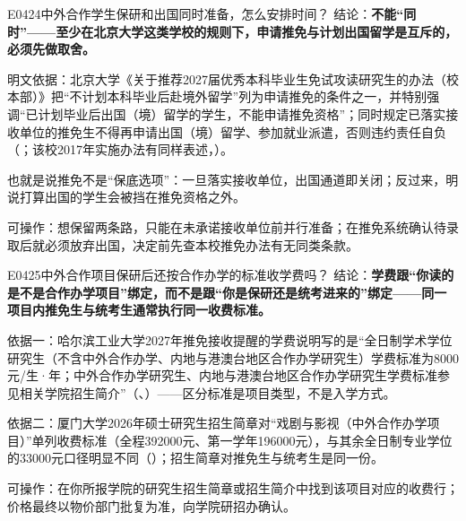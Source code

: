 \begin{qa}{E0424}{中外合作学生保研和出国同时准备，怎么安排时间？}
结论：\textbf{不能“同时”——至少在北京大学这类学校的规则下，申请推免与计划出国留学是互斥的，必须先做取舍。}

明文依据：北京大学《关于推荐2027届优秀本科毕业生免试攻读研究生的办法（校本部）》把“不计划本科毕业后赴境外留学”列为申请推免的条件之一，并特别强调“已计划毕业后出国（境）留学的学生，不能申请推免资格”；同时规定已落实接收单位的推免生不得再申请出国（境）留学、参加就业派遣，否则违约责任自负（；该校2017年实施办法有同样表述，）。

也就是说推免不是“保底选项”：一旦落实接收单位，出国通道即关闭；反过来，明说打算出国的学生会被挡在推免资格之外。

可操作：想保留两条路，只能在未承诺接收单位前并行准备；在推免系统确认待录取后就必须放弃出国，决定前先查本校推免办法有无同类条款。
\end{qa}

\begin{qa}{E0425}{中外合作项目保研后还按合作办学的标准收学费吗？}
结论：\textbf{学费跟“你读的是不是合作办学项目”绑定，而不是跟“你是保研还是统考进来的”绑定——同一项目内推免生与统考生通常执行同一收费标准。}

依据一：哈尔滨工业大学2027年推免接收提醒的学费说明写的是“全日制学术学位研究生（不含中外合作办学、内地与港澳台地区合作办学研究生）学费标准为8000元/生·年；中外合作办学研究生、内地与港澳台地区合作办学研究生学费标准参见相关学院招生简介”（、）——区分标准是项目类型，不是入学方式。

依据二：厦门大学2026年硕士研究生招生简章对“戏剧与影视（中外合作办学项目）”单列收费标准（全程392000元、第一学年196000元），与其余全日制专业学位的33000元口径明显不同（）；招生简章对推免生与统考生是同一份。

可操作：在你所报学院的研究生招生简章或招生简介中找到该项目对应的收费行；价格最终以物价部门批复为准，向学院研招办确认。
\end{qa}

